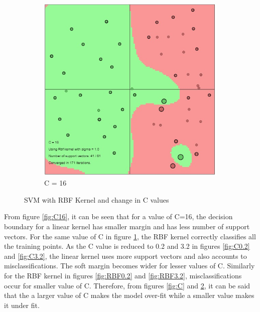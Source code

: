 {\begin{figure}[!ht]
\begin{subfigure}{.32\textwidth}
		\includegraphics[width=.65\linewidth]{Exercise1/Report/RBF_C(16).jpg}
		\caption{C = 16}
		\label{fig:RBF16}
	\end{subfigure}
	\caption{SVM with RBF Kernel and change in C values}
	\label{fig:RBF}
\end{figure}

From figure \ref{fig:C16}, it can be seen that for a value of C=16, the decision boundary for a linear kernel has smaller margin and has less number of support vectors. For the same value of C in figure \ref{fig:RBF16}, the RBF kernel correctly classifies all the training points.
As the C value is reduced to 0.2 and 3.2 in figures \ref{fig:C0.2} and \ref{fig:C3.2}, the linear kernel uses more support vectors and also accounts to misclassifications. The soft margin becomes wider for lesser values of C. Similarly for the RBF kernel in figures \ref{fig:RBF0.2} and \ref{fig:RBF3.2}, misclassifications occur for smaller value of C. Therefore, from figures \ref{fig:C} and \ref{fig:RBF}, it can be said that the a larger value of C makes the model over-fit while a smaller value makes it under fit. 

}
